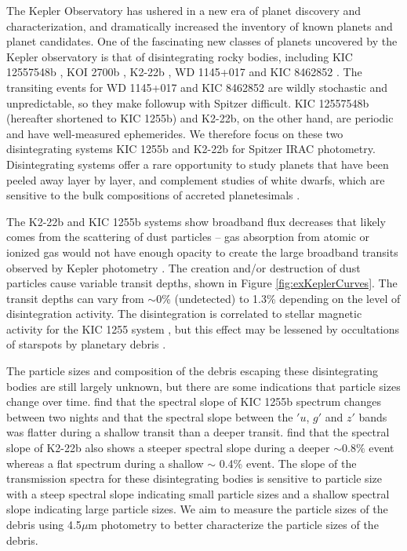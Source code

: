 \documentclass[letterpaper,12pt]{article}
\begin{document}
The Kepler Observatory has ushered in a new era of planet discovery and characterization, and dramatically increased the inventory of known planets and planet candidates.
One of the fascinating new classes of planets uncovered by the Kepler observatory is that of disintegrating rocky bodies,
including KIC 12557548b \citep{rappaport}, KOI 2700b \citep{rappaport2014KOI2700}, K2-22b \citep{sanchis-ojedak2-22}, WD 1145+017 \citep{vanderburg2015wdDisintegrating} and KIC 8462852 \citep{boyajian846}.
The transiting events for WD 1145+017 and KIC 8462852 are wildly stochastic and unpredictable, so they make followup with Spitzer difficult.
KIC 12557548b (hereafter shortened to KIC 1255b) and K2-22b, on the other hand, are periodic and have well-measured ephemerides.
We therefore focus on these two disintegrating systems KIC 1255b  and K2-22b for Spitzer IRAC photometry.
Disintegrating systems offer a rare opportunity to study planets that have been peeled away layer by layer, and complement studies of white dwarfs, which are sensitive to the bulk compositions of accreted planetesimals \cite[e.g.][]{jura2003wdPollution}.

The K2-22b and KIC 1255b systems show broadband flux decreases that likely comes from the scattering of dust particles -- gas absorption from atomic or ionized gas would not have enough opacity to create the large broadband transits observed by Kepler photometry \citep[0.423 $\mu$m to 0.897 $\mu$m bandpass;][]{koch2010keplerChar}.
The creation and/or destruction of dust particles cause variable transit depths, shown in Figure \ref{fig:exKeplerCurves}.
The transit depths can vary from $\sim$0\% (undetected) to 1.3\% depending on the level of disintegration activity.
The disintegration is correlated to stellar magnetic activity for the KIC 1255 system \citep{kawahara2013starspots}, but this effect may be lessened by occultations of starspots by planetary debris \citep{croll2015starspots}.

The particle sizes and composition of the debris escaping these disintegrating bodies are still largely unknown, but there are some indications that particle sizes change over time.
\citet{bochinski2015evolving} find that the spectral slope of KIC 1255b spectrum changes between two nights and that the spectral slope between the $'u$, $g'$ and $z'$ bands was flatter during a shallow transit than a deeper transit. 
\cite{sanchis-ojedak2-22} find that the spectral slope of K2-22b also shows a steeper spectral slope during a deeper $\sim 0.8\%$ event whereas a flat spectrum during a shallow $\sim$ 0.4\% event.
The slope of the transmission spectra for these disintegrating bodies is sensitive to particle size with a steep spectral slope indicating small particle sizes and a shallow spectral slope indicating large particle sizes.
We aim to measure the particle sizes of the debris using 4.5$\mu$m photometry to better characterize the particle sizes of the debris.
\end{document}
